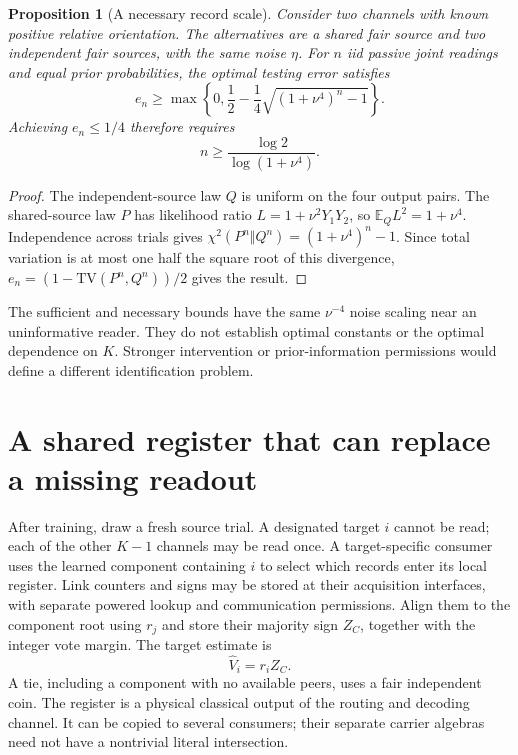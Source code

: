 \documentclass[11pt]{article}
\newtheorem{proposition}[theorem]{Proposition}
\theoremstyle{definition}
\theoremstyle{remark}
\newcommand{\E}{\mathbb E}
\begin{document}
\begin{proposition}[A necessary record scale]
\label{prop:lower}
Consider two channels with known positive relative orientation. The alternatives are a shared fair source and two independent fair sources, with the same noise $\eta$. For $n$ iid passive joint readings and equal prior probabilities, the optimal testing error satisfies
\begin{equation}
 e_n\ge\max\left\{0,\frac12-\frac14
 \sqrt{(1+\nu^4)^n-1}\right\}.
 \label{eq:lower}
\end{equation}
Achieving $e_n\le1/4$ therefore requires
\begin{equation}
 n\ge\frac{\log2}{\log(1+\nu^4)}.
\end{equation}
\end{proposition}
\begin{proof}
The independent-source law $Q$ is uniform on the four output pairs. The shared-source law $P$ has likelihood ratio $L=1+\nu^2Y_1Y_2$, so $\E_QL^2=1+\nu^4$. Independence across trials gives $\chi^2(P^n\Vert Q^n)=(1+\nu^4)^n-1$. Since total variation is at most one half the square root of this divergence, $e_n=(1-\mathrm{TV}(P^n,Q^n))/2$ gives the result.
\end{proof}

The sufficient and necessary bounds have the same $\nu^{-4}$ noise scaling near an uninformative reader. They do not establish optimal constants or the optimal dependence on $K$. Stronger intervention or prior-information permissions would define a different identification problem.

\section{A shared register that can replace a missing readout}
\label{sec:register}

After training, draw a fresh source trial. A designated target $i$ cannot be read; each of the other $K-1$ channels may be read once. A target-specific consumer uses the learned component containing $i$ to select which records enter its local register. Link counters and signs may be stored at their acquisition interfaces, with separate powered lookup and communication permissions. Align them to the component root using $r_j$ and store their majority sign $Z_C$, together with the integer vote margin. The target estimate is
\begin{equation}
 \widehat V_i=r_i Z_C.
 \label{eq:decoder}
\end{equation}
A tie, including a component with no available peers, uses a fair independent coin. The register is a physical classical output of the routing and decoding channel. It can be copied to several consumers; their separate carrier algebras need not have a nontrivial literal intersection.
\end{document}
